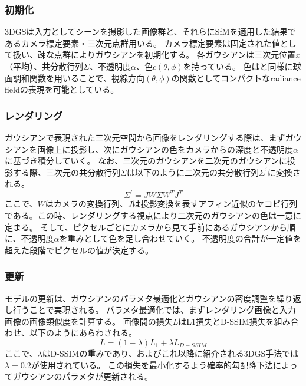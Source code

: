 \subsubsection*{初期化}
3DGSは入力としてシーンを撮影した画像群と、それらにSfMを適用した結果であるカメラ標定要素・三次元点群用いる。
カメラ標定要素は固定された値として扱い、疎な点群によりガウシアンを初期化する。
各ガウシアンは三次元位置$x$（平均）、共分散行列$\Sigma$、不透明度$\alpha$、色$c(\theta, \phi)$を持っている。
色は\cite{plenoxels}\cite{instant-ngp}と同様に球面調和関数を用いることで、視線方向$(\theta, \phi)$の関数としてコンパクトなradiance fieldの表現を可能としている。\par

\subsubsection*{レンダリング}
ガウシアンで表現された三次元空間から画像をレンダリングする際は、まずガウシアンを画像上に投影し、次にガウシアンの色をカメラからの深度と不透明度$\alpha$に基づき積分していく。
なお、三次元のガウシアンを二次元のガウシアンに投影する際、三次元の共分散行列$\Sigma$は以下のように二次元の共分散行列$\Sigma^{\prime}$に変換される。
\begin{equation}
  \Sigma^{\prime}=J W \Sigma W^T J^T
\end{equation}
ここで、$W$はカメラの変換行列、$J$は投影変換を表すアフィン近似のヤコビ行列である。この時、レンダリングする視点により二次元のガウシアンの色は一意に定まる。
そして、ピクセルごとにカメラから見て手前にあるガウシアンから順に、不透明度$\alpha$を重みとして色を足し合わせていく。
不透明度の合計が一定値を超えた段階でピクセルの値が決定する。\par

\subsubsection*{更新}
モデルの更新は、ガウシアンのパラメタ最適化とガウシアンの密度調整を繰り返し行うことで実現される。
パラメタ最適化では、まずレンダリング画像と入力画像の画像類似度を計算する。
画像間の損失$L$はL1損失とD-SSIM損失\cite{d-ssim}を組み合わせ、以下のようにあらわされる。
\begin{equation}
  L = (1 - \lambda)L_1 + {\lambda}L_{D-SSIM}
\end{equation}
ここで、$\lambda$はD-SSIMの重みであり、\cite{3dgs}およびこれ以降に紹介される3DGS手法では$\lambda = 0.2$が使用されている。
この損失を最小化するよう確率的勾配降下法によってガウシアンのパラメタが更新される。\par

